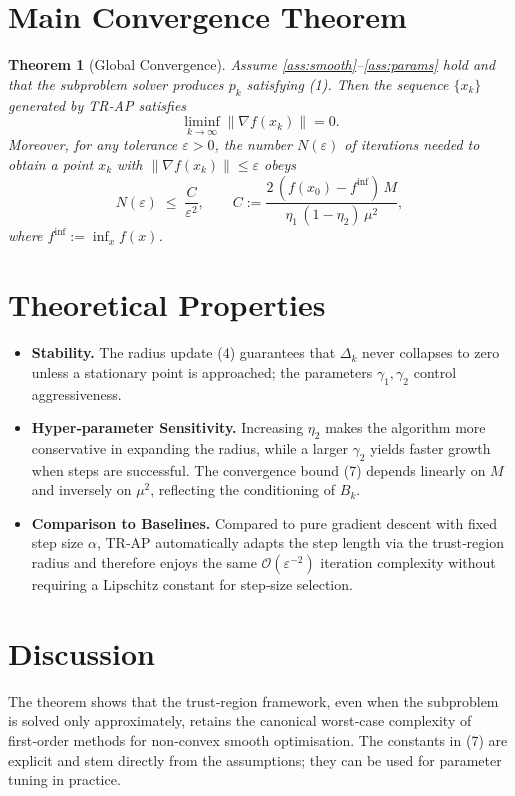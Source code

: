 \documentclass{article}
\newtheorem{theorem}{Theorem}
\begin{document}
\section*{Main Convergence Theorem}
\begin{theorem}[Global Convergence]\label{thm:global}
Assume \ref{ass:smooth}–\ref{ass:params} hold and that the subproblem solver
produces $p_{k}$ satisfying (1). Then the sequence $\{x_{k}\}$ generated by
TR‑AP satisfies
\[
\liminf_{k\to\infty}\|\nabla f(x_{k})\|=0.
\]
Moreover, for any tolerance $\varepsilon>0$, the number $N(\varepsilon)$ of
iterations needed to obtain a point $x_{k}$ with $\|\nabla f(x_{k})\|\le\varepsilon$
obeys
\[
N(\varepsilon)\;\le\;
\frac{C}{\varepsilon^{2}},
\qquad
C:=\frac{2\,(f(x_{0})-f^{\inf})\,M}{\eta_{1}\,(1-\eta_{2})\,\mu^{2}},
\tag{7}
\]
where $f^{\inf}:=\inf_{x}f(x)$.
\end{theorem}

\section*{Theoretical Properties}
\begin{itemize}[leftmargin=*]
\item \textbf{Stability.} The radius update (4) guarantees that $\Delta_{k}$
never collapses to zero unless a stationary point is approached; the
parameters $\gamma_{1},\gamma_{2}$ control aggressiveness.
\item \textbf{Hyper‑parameter Sensitivity.}
Increasing $\eta_{2}$ makes the algorithm more conservative in expanding the
radius, while a larger $\gamma_{2}$ yields faster growth when steps are
successful. The convergence bound (7) depends linearly on $M$ and inversely on
$\mu^{2}$, reflecting the conditioning of $B_{k}$.
\item \textbf{Comparison to Baselines.}
Compared to pure gradient descent with fixed step size $\alpha$, TR‑AP
automatically adapts the step length via the trust‑region radius and
therefore enjoys the same $\mathcal{O}(\varepsilon^{-2})$ iteration
complexity without requiring a Lipschitz constant for step‑size selection.
\end{itemize}

\section*{Discussion}
The theorem shows that the trust‑region framework, even when the subproblem
is solved only approximately, retains the canonical worst‑case complexity of
first‑order methods for non‑convex smooth optimisation. The constants in
(7) are explicit and stem directly from the assumptions; they can be used for
parameter tuning in practice.
\end{document}
